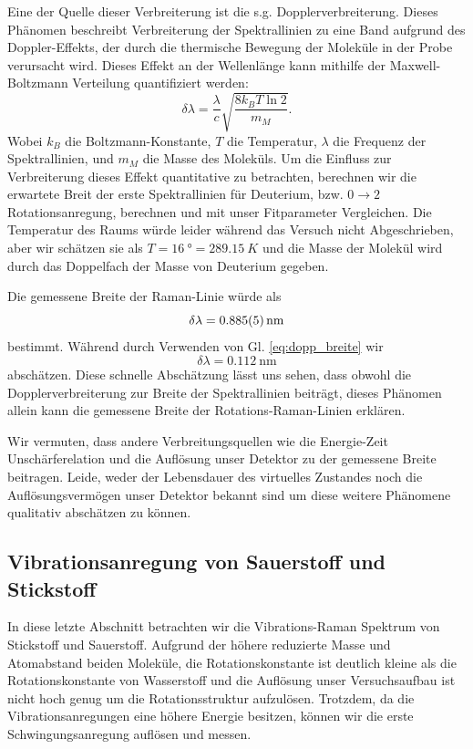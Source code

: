 \documentclass[11 pt]{article}
\begin{document}
Eine der Quelle dieser Verbreiterung ist die s.g. Dopplerverbreiterung. Dieses Phänomen beschreibt Verbreiterung der Spektrallinien zu eine Band aufgrund des Doppler-Effekts, der durch die thermische Bewegung der Moleküle in der Probe verursacht wird. Dieses Effekt an der Wellenlänge kann mithilfe der Maxwell-Boltzmann Verteilung quantifiziert werden:
\begin{equation}
\label{eq:dopp_breite}
\delta \lambda = \dfrac{\lambda}{c} \sqrt{\dfrac{8k_B T \ln 2}{m_{M}}}. 
\end{equation}
Wobei $k_B$ die Boltzmann-Konstante, $T$ die Temperatur, $\lambda$ die Frequenz der Spektrallinien, und $m_{M}$ die Masse des Moleküls. Um die Einfluss zur Verbreiterung dieses Effekt quantitative zu betrachten, berechnen wir die erwartete Breit der erste
Spektrallinien für Deuterium, bzw. $0\to 2$ Rotationsanregung, berechnen und mit unser Fitparameter Vergleichen. Die Temperatur des Raums würde leider während das Versuch nicht Abgeschrieben, aber wir schätzen sie als $T = \SI{16}{\degree} = \SI{289.15}{K}$ und die Masse der Molekül wird durch das Doppelfach der Masse von Deuterium gegeben. 

Die gemessene Breite der Raman-Linie würde als
$$\delta \lambda = \SI{0.885 \pm 0.005}{\nano\meter}$$
bestimmt. Während durch Verwenden von Gl. \ref{eq:dopp_breite} wir
$$\delta \lambda =  \SI{0.112}{\nano\meter}$$
abschätzen. Diese schnelle Abschätzung lässt uns sehen, dass obwohl die Dopplerverbreiterung zur Breite der Spektrallinien beiträgt, dieses Phänomen allein kann die gemessene Breite der Rotations-Raman-Linien erklären. 

Wir vermuten, dass andere Verbreitungsquellen wie die Energie-Zeit Unschärferelation und die Auflösung unser Detektor zu der gemessene Breite beitragen. Leide, weder der Lebensdauer des virtuelles Zustandes noch die Auflösungsvermögen unser Detektor bekannt sind um diese weitere Phänomene qualitativ abschätzen zu können. 

\subsection{Vibrationsanregung von Sauerstoff und Stickstoff}
In diese letzte Abschnitt betrachten wir die Vibrations-Raman Spektrum von Stickstoff und Sauerstoff. Aufgrund der höhere reduzierte Masse und Atomabstand beiden Moleküle, die Rotationskonstante ist deutlich kleine als die Rotationskonstante von Wasserstoff und die Auflösung unser Versuchsaufbau ist nicht hoch genug um die Rotationsstruktur aufzulösen. Trotzdem, da die Vibrationsanregungen eine höhere Energie besitzen, können wir die erste Schwingungsanregung auflösen und messen. 
\end{document}
